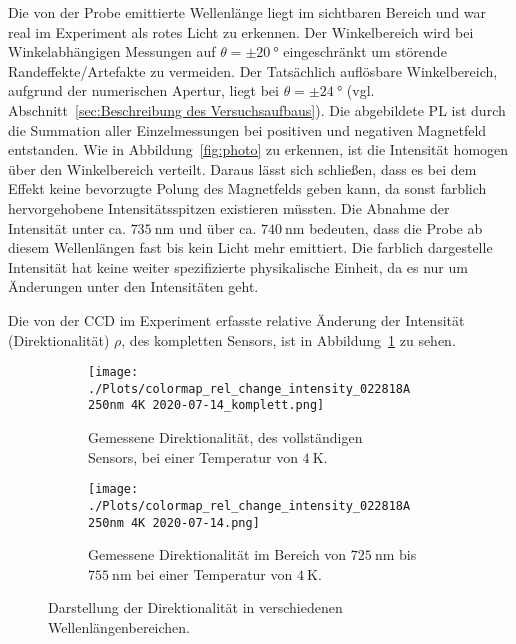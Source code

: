 Die von der Probe emittierte Wellenlänge liegt im sichtbaren Bereich und war real im Experiment als rotes Licht zu erkennen.
Der Winkelbereich wird bei Winkelabhängigen Messungen auf $\theta = \pm \SI{20}{\degree}$ 
eingeschränkt um störende Randeffekte/Artefakte zu vermeiden. 
Der Tatsächlich auflösbare Winkelbereich, aufgrund der numerischen Apertur, liegt bei $\theta = \pm \SI{24}{\degree}$ 
(vgl. Abschnitt~\ref{sec:Beschreibung des Versuchsaufbaus}).
Die abgebildete PL ist durch die Summation aller Einzelmessungen 
bei positiven und negativen Magnetfeld entstanden. 
Wie in Abbildung~\ref{fig:photo} zu erkennen, ist die Intensität homogen über den Winkelbereich verteilt.
Daraus lässt sich schließen, dass es bei dem Effekt keine bevorzugte Polung des Magnetfelds
geben kann, da sonst farblich hervorgehobene Intensitätsspitzen existieren müssten. 
Die Abnahme der Intensität unter ca. $\SI{735}{\nano\meter}$ und über ca. 
$\SI{740}{\nano\meter}$ bedeuten, dass die Probe ab diesem Wellenlängen fast bis kein Licht mehr emittiert.
Die farblich dargestelle Intensität hat keine weiter spezifizierte physikalische Einheit, da es nur um Änderungen unter
den Intensitäten geht.

Die von der CCD im Experiment erfasste relative Änderung der Intensität (Direktionalität) $\rho$,
des kompletten Sensors, ist in Abbildung~\ref{fig:rel_komplett} zu sehen.
\begin{figure}
    \begin{subfigure}{0.50\textwidth}
        \texttt{[image: ./Plots/colormap\_rel\_change\_intensity\_022818A 250nm 4K 2020-07-14\_komplett.png]}
        \caption{Gemessene Direktionalität, des vollständigen\\ Sensors, bei einer Temperatur von $\SI{4}{\kelvin}$.}
        \label{fig:rel_komplett}
    \end{subfigure}
    \begin{subfigure}{0.50\textwidth}
        \texttt{[image: ./Plots/colormap\_rel\_change\_intensity\_022818A 250nm 4K 2020-07-14.png]}
        \caption{Gemessene Direktionalität im Bereich von $\SI{725}{\nano\meter}$ bis $\SI{755}{\nano\meter}$
        bei einer Temperatur von $\SI{4}{\kelvin}$.}
        \label{fig:rel}
    \end{subfigure}
    \caption{Darstellung der Direktionalität in verschiedenen Wellenlängenbereichen.}
    \label{fig:rho}
\end{figure}
\FloatBarrier

